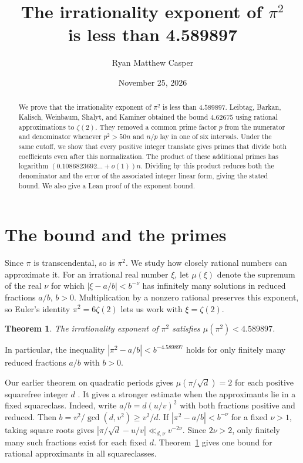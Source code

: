 \documentclass[11pt]{article}
\title{The irrationality exponent of \texorpdfstring{$\pi^2$}{pi squared}\\is less than 4.589897}
\author{Ryan Matthew Casper}
\date{November 25, 2026}
\newtheorem{theorem}{Theorem}
\begin{document}
\maketitle
\begin{abstract}
We prove that the irrationality exponent of $\pi^2$ is less than
$4.589897$. Leibtag, Barkan, Kalisch, Weinbaum, Shalyt, and Kaminer
obtained the bound $4.62675$ using rational approximations to
$\zeta(2)$. They removed a common prime factor $p$ from the numerator
and denominator whenever $p^2>50n$ and $n/p$ lay in one of six
intervals. Under the same cutoff, we show that every positive integer
translate gives primes that divide both coefficients even after this
normalization. The product of these additional
primes has logarithm $(0.1086823692\ldots+o(1))n$. Dividing by this
product reduces both the denominator and the error of the associated
integer linear form, giving the stated bound. We also give a Lean proof of the exponent bound.
\end{abstract}

\section{The bound and the primes}
Since $\pi$ is transcendental, so is $\pi^2$. We study how closely
rational numbers can approximate it. For an irrational real number
$\xi$, let $\mu(\xi)$ denote the supremum
of the real $\nu$ for which $|\xi-a/b|<b^{-\nu}$ has infinitely many
solutions in reduced fractions $a/b$, $b>0$. Multiplication by a nonzero
rational preserves this exponent, so Euler's identity
$\pi^2=6\zeta(2)$ lets us work with $\xi=\zeta(2)$.

\begin{theorem}\label{th:main}
The irrationality exponent of $\pi^2$ satisfies $\mu(\pi^2)<4.589897$.
\end{theorem}

In particular, the inequality $|\pi^2-a/b|<b^{-4.589897}$ holds
for only finitely many reduced fractions $a/b$ with $b>0$.

Our earlier theorem on quadratic periods gives $\mu(\pi/\sqrt d)=2$
for each positive squarefree integer $d$ \cite[Theorem~1(1)]{Casper}.
It gives a stronger estimate when the approximants lie in a fixed
squareclass. Indeed, write $a/b=d(u/v)^2$ with both fractions positive
and reduced. Then $b=v^2/\gcd(d,v^2)\ge v^2/d$.
If $|\pi^2-a/b|<b^{-\nu}$ for a fixed $\nu>1$, taking square roots gives
$|\pi/\sqrt d-u/v|\ll_{d,\nu}v^{-2\nu}$. Since $2\nu>2$, only finitely
many such fractions exist for each fixed $d$. Theorem~\ref{th:main}
gives one bound for rational approximants in all squareclasses.
\end{document}
